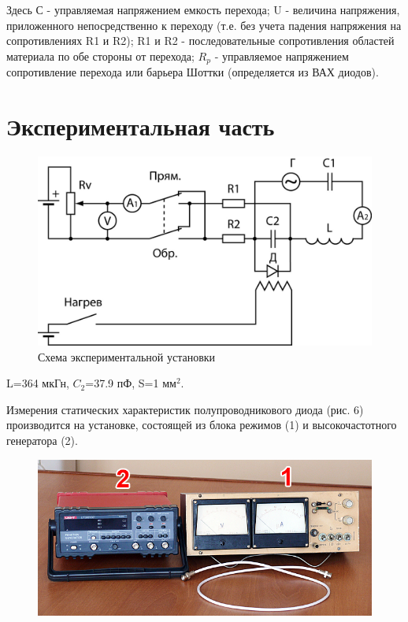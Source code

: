 Здесь С - управляемая напряжением емкость перехода; U - величина напряжения, приложенного непосредственно к переходу (т.е. без учета падения напряжения на сопротивлениях R1 и R2); R1 и R2 - последовательные сопротивления областей материала по обе стороны от перехода; $R_p$ - управляемое напряжением сопротивление перехода или барьера Шоттки (определяется из ВАХ диодов).

\newpage
\section{Экспериментальная часть}
\begin{figure}[h!]
	\centering
	\includegraphics[width=0.5\linewidth]{imgs/fig5.jpg}
	\caption{Схема экспериментальной установки}
	\label{fig:5}
\end{figure}

L=364 мкГн, $C_2$=37.9 пФ, S=1 мм$^2$.

Измерения статических характеристик полупроводникового диода (рис. 6) производится на установке, состоящей из блока
режимов (1) и высокочастотного генератора (2).

\begin{figure}[h!]
	\centering
	\includegraphics[width=0.6\linewidth]{imgs/fig6.jpg}
	\caption{}
	\label{fig:6}
\end{figure}

